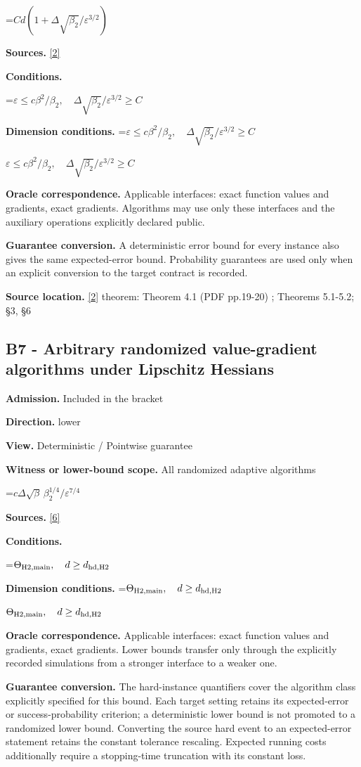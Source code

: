 \documentclass[10pt,a4paper]{article}
\newcommand{\AtlasMath}[1]{\par\begingroup\centering\setbox0=\hbox{$\displaystyle #1$}\ifdim\wd0>1.4\linewidth\typeout{ATLAS WIDE FORMULA: \the\wd0}\fi\ifdim\wd0>\linewidth\resizebox{\linewidth}{!}{\box0}\else\box0\fi\par\endgroup}
\newcommand{\AtlasInlineMath}[1]{\begingroup\setbox0=\hbox{$#1$}\ifdim\wd0>.4\linewidth\endgroup\AtlasMath{#1}\else\endgroup$#1$\fi}
\begin{document}
\AtlasMath{Cd(1+\Delta\sqrt{\beta_2}/\varepsilon^{3/2})}
\textbf{Sources.} \href{https://arxiv.org/pdf/2610.02791}{[2]}

\textbf{Conditions.} 
\AtlasMath{\varepsilon\le c\beta^2/\beta_2,\quad\Delta\sqrt{\beta_2}/\varepsilon^{3/2}\ge C}


\textbf{Dimension conditions.} \AtlasInlineMath{\varepsilon\le c\beta^2/\beta_2,\quad\Delta\sqrt{\beta_2}/\varepsilon^{3/2}\ge C}

\textbf{Oracle correspondence.} Applicable interfaces: exact function values and gradients, exact gradients. Algorithms may use only these interfaces and the auxiliary operations explicitly declared public.

\textbf{Guarantee conversion.} A deterministic error bound for every instance also gives the same expected-error bound. Probability guarantees are used only when an explicit conversion to the target contract is recorded.

\textbf{Source location.} \href{https://arxiv.org/pdf/2610.02791}{[2]} theorem: Theorem 4.1 (PDF pp.19-20) ; Theorems 5.1-5.2; §3, §6

\subsection{B7 - Arbitrary randomized value-gradient algorithms under Lipschitz Hessians}
\textbf{Admission.} Included in the bracket

\textbf{Direction.} lower

\textbf{View.} Deterministic / Pointwise guarantee

\textbf{Witness or lower-bound scope.} All randomized adaptive algorithms

\AtlasMath{c\Delta\sqrt\beta\,\beta_2^{1/4}/\varepsilon^{7/4}}
\textbf{Sources.} \href{https://arxiv.org/pdf/2610.00245v2}{[6]}

\textbf{Conditions.} 
\AtlasMath{\Theta_{\rm H2,main},\quad d\ge d_{\rm hd,H2}}


\textbf{Dimension conditions.} \AtlasInlineMath{\Theta_{\rm H2,main},\quad d\ge d_{\rm hd,H2}}

\textbf{Oracle correspondence.} Applicable interfaces: exact function values and gradients, exact gradients. Lower bounds transfer only through the explicitly recorded simulations from a stronger interface to a weaker one.

\textbf{Guarantee conversion.} The hard-instance quantifiers cover the algorithm class explicitly specified for this bound. Each target setting retains its expected-error or success-probability criterion; a deterministic lower bound is not promoted to a randomized lower bound. Converting the source hard event to an expected-error statement retains the constant tolerance rescaling. Expected running costs additionally require a stopping-time truncation with its constant loss.
\end{document}
